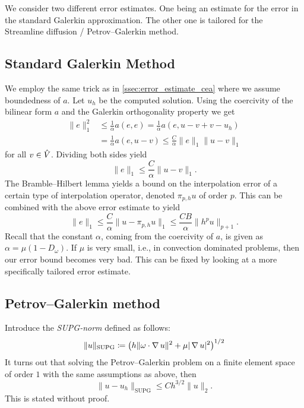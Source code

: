 We consider two different error estimates. One being an estimate for the error
in the standard Galerkin approximation. The other one is tailored for the
Streamline diffusion / Petrov--Galerkin method.

\subsection{Standard Galerkin Method}

We employ the same trick as in \vref{ssec:error_estimate_cea} where we assume
boundedness of \(a\). Let \( u_h \) be the computed solution. Using the
coercivity of the bilinear form \( a \) and the Galerkin orthogonality property
we get
\begin{align}
    \|e\|_1^2 &\leq \frac{1}{\alpha} a(e, e) = \frac{1}{\alpha} a(e, u - v + v - u_h)\\
              &= \frac{1}{\alpha}a(e, u - v) \leq \frac{C}{\alpha}\| e\|_1 \| u - v \|_1
\end{align}
for all \( v \in \hat{V} \).
Dividing both sides yield
\begin{equation}
    \| e \|_1 \leq \frac{C}{\alpha}\| u - v \|_1.
\end{equation}
The Bramble--Hilbert lemma yields a bound on the interpolation error of a
certain type of interpolation operator, denoted \( \pi_{p, h} u \) of order \(
p \). This can be combined with the above error estimate to yield
\begin{equation}
    \| e \|_1 \leq \frac{C}{\alpha}\| u - \pi_{p, h} u \|_1 \leq \frac{CB}{\alpha} \| h^p u \|_{p+1}.
\end{equation}
Recall that the constant \( \alpha \), coming from the coercivity of \(a \), is
given as \( \alpha = \mu ( 1 - D_\omega) \). If \( \mu \) is very small, i.e.,
in convection dominated problems,  then our error bound becomes very bad. This
can be fixed by looking at a more specifically tailored error estimate.

\subsection{Petrov--Galerkin method}

Introduce the \emph{SUPG-norm} defined as follows:
\begin{equation}
    \| u \|_{\mathrm{SUPG}} \coloneqq \left(h \| \omega \cdot \operatorname{\mathop{}\!\nabla} u \|^2 + \mu | \operatorname{\mathop{}\!\nabla} u |^2 \right)^{1 / 2}
\end{equation}
It turns out that solving the Petrov--Galerkin problem on a finite element
space of order \( 1 \) with the same assumptions as above, then
\begin{equation}
    \| u - u_h\|_{\mathrm{SUPG}} \leq Ch^{3/2} \|u\|_2.
\end{equation}
This is stated without proof.
